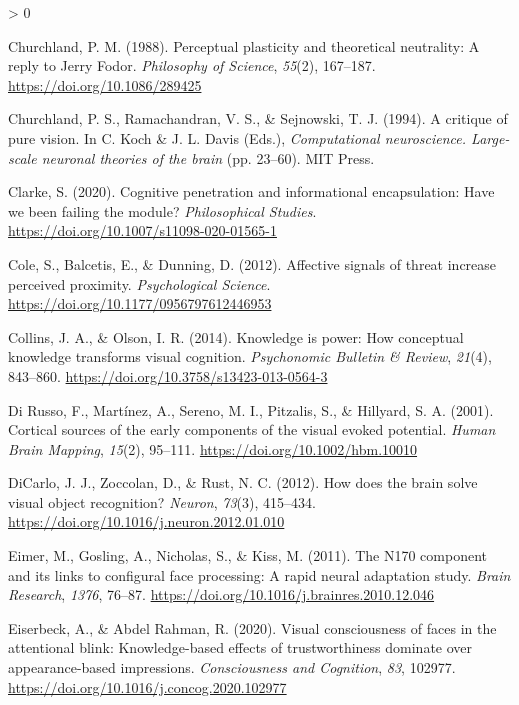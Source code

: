 \documentclass[
  english,
  doc,12pt,twoside,floatsintext]{apa7}
\newlength{\cslhangindent}
\newenvironment{CSLReferences}[2] %
 {%
  \setlength{\parindent}{0pt}
  \ifodd #1 \everypar{\setlength{\hangindent}{\cslhangindent}}\ignorespaces\fi
  \ifnum #2 > 0
  \setlength{\parskip}{#2\baselineskip}
  \fi
 }%
 {}
\begin{document}
\begin{CSLReferences}{1}{0}
\leavevmode\hypertarget{ref-churchland1988}{}%
Churchland, P. M. (1988). Perceptual plasticity and theoretical neutrality: A reply to {Jerry} {Fodor}. \emph{Philosophy of Science}, \emph{55}(2), 167--187. \url{https://doi.org/10.1086/289425}

\leavevmode\hypertarget{ref-churchland1994}{}%
Churchland, P. S., Ramachandran, V. S., \& Sejnowski, T. J. (1994). A critique of pure vision. In C. Koch \& J. L. Davis (Eds.), \emph{Computational neuroscience. Large-scale neuronal theories of the brain} (pp. 23--60). MIT Press.

\leavevmode\hypertarget{ref-clarke2020}{}%
Clarke, S. (2020). Cognitive penetration and informational encapsulation: Have we been failing the module? \emph{Philosophical Studies}. \url{https://doi.org/10.1007/s11098-020-01565-1}

\leavevmode\hypertarget{ref-cole2012}{}%
Cole, S., Balcetis, E., \& Dunning, D. (2012). Affective signals of threat increase perceived proximity. \emph{Psychological Science}. \url{https://doi.org/10.1177/0956797612446953}

\leavevmode\hypertarget{ref-collins2014}{}%
Collins, J. A., \& Olson, I. R. (2014). Knowledge is power: How conceptual knowledge transforms visual cognition. \emph{Psychonomic Bulletin \& Review}, \emph{21}(4), 843--860. \url{https://doi.org/10.3758/s13423-013-0564-3}

\leavevmode\hypertarget{ref-dirusso2001}{}%
Di Russo, F., Martínez, A., Sereno, M. I., Pitzalis, S., \& Hillyard, S. A. (2001). Cortical sources of the early components of the visual evoked potential. \emph{Human Brain Mapping}, \emph{15}(2), 95--111. \url{https://doi.org/10.1002/hbm.10010}

\leavevmode\hypertarget{ref-dicarlo2012}{}%
DiCarlo, J. J., Zoccolan, D., \& Rust, N. C. (2012). How does the brain solve visual object recognition? \emph{Neuron}, \emph{73}(3), 415--434. \url{https://doi.org/10.1016/j.neuron.2012.01.010}

\leavevmode\hypertarget{ref-eimer2011}{}%
Eimer, M., Gosling, A., Nicholas, S., \& Kiss, M. (2011). The {N170} component and its links to configural face processing: A rapid neural adaptation study. \emph{Brain Research}, \emph{1376}, 76--87. \url{https://doi.org/10.1016/j.brainres.2010.12.046}

\leavevmode\hypertarget{ref-eiserbeck2020}{}%
Eiserbeck, A., \& Abdel Rahman, R. (2020). Visual consciousness of faces in the attentional blink: Knowledge-based effects of trustworthiness dominate over appearance-based impressions. \emph{Consciousness and Cognition}, \emph{83}, 102977. \url{https://doi.org/10.1016/j.concog.2020.102977}


\end{CSLReferences}
\end{document}
